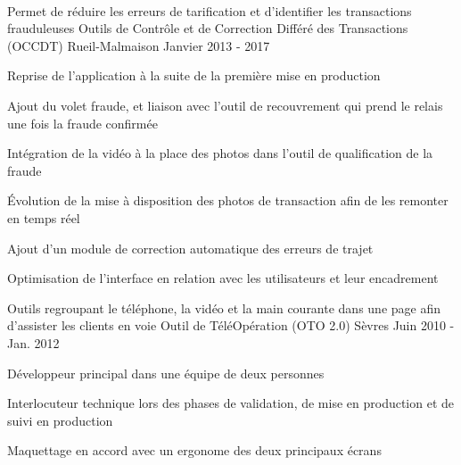 ~~~~\\

\begin{cventries}

  \cventry
    {Permet de réduire les erreurs de tarification et d'identifier les transactions frauduleuses} %
    {Outils de Contrôle et de Correction Différé des Transactions (OCCDT)} %
    {Rueil-Malmaison} %
    {Janvier 2013 - 2017} %
    {
      \begin{cvitems} %
        \item {Reprise de l'application à la suite de la première mise en production}
        \item {Ajout du volet fraude, et liaison avec l'outil de recouvrement qui prend le relais une fois la fraude confirmée}
        \item {Intégration de la vidéo à la place des photos dans l'outil de qualification de la fraude}
        \item {Évolution de la mise à disposition des photos de transaction afin de les remonter en temps réel}
        \item {Ajout d'un module de correction automatique des erreurs de trajet}
        \item {Optimisation de l'interface en relation avec les utilisateurs et leur encadrement}
      \end{cvitems}
    } 

  \cventry
    {Outils regroupant le téléphone, la vidéo et la main courante dans une page afin d'assister les clients en voie} %
    {Outil de TéléOpération (OTO 2.0)} %
    {Sèvres} %
    {Juin 2010 - Jan. 2012} %
    {
      \begin{cvitems} %
        \item {Développeur principal dans une équipe de deux personnes}
        \item {Interlocuteur technique lors des phases de validation, de mise en production et de suivi en production}
        \item {Maquettage en accord avec un ergonome des deux principaux écrans}
      \end{cvitems}
    }


\end{cventries}
